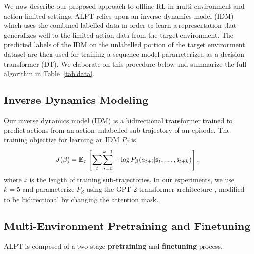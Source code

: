 \documentclass{article} %
\newcommand{\ofir}[1]{{\color{blue} Ofir: #1}}
\begin{document}

We now describe our proposed approach to offline RL in multi-environment and action limited settings. ALPT relies upon an inverse dynamics model (IDM) which uses the combined labelled data in order to learn a representation that generalizes well to the limited action data from the target environment. The predicted labels of the IDM on the unlabelled portion of the target environment dataset are then used for training a sequence model parameterized as a decision transformer (DT). %
We elaborate on this procedure below and summarize the full algorithm in Table~\ref{tab:data}.

\subsection{Inverse Dynamics Modeling}
\label{idm}
Our inverse dynamics model (IDM) is a bidirectional transformer trained to predict actions from an action-unlabelled sub-trajectory of an episode. The training objective for learning an IDM $P_{\beta}$ is
\begin{equation}
\label{eq:idm}
    J(\beta) = \mathbb{E}_{\tau}\left[\sum_t \sum_{i=0}^{k-1} - \log P_{\beta} (a_{t+i} | \mathbf{s}_t, \dots, \mathbf{s}_{t+k})\right],
\end{equation}
where $k$ is the length of training sub-trajectories.
In our experiments, we use $k=5$ and parameterize $P_\beta$ using the GPT-2 transformer architecture \citep{radford2019language}, modified to be bidirectional by changing the attention mask.  %

\subsection{Multi-Environment Pretraining and Finetuning}
\label{multigametrain}
ALPT is composed of a two-stage \textbf{pretraining} and \textbf{finetuning} process.  
\end{document}
